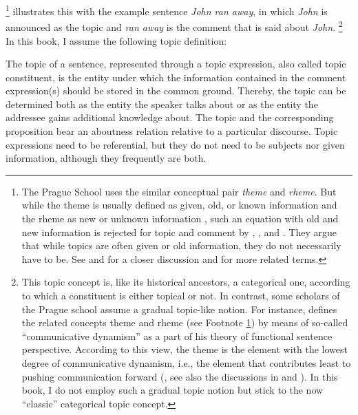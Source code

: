 \footnote{\label{note:prague}The Prague School uses the similar conceptual pair \textit{theme} and \textit{rheme}. 
But while the theme is usually defined as given,  old, or known information and the rheme as new or unknown information \citep[e.g.,][]{danes1970}, such an equation with old and new information is rejected for topic and comment by \citet{reinhart1981}, \citet{molnar1991}, and \citet{krifka2007}.
They argue that while topics are often given  or old information, they do not necessarily have to be.
See \citet[204--205]{musan2002} and \citet[12--13; 60--62]{molnar1991} for a closer discussion and for more related terms.}
%
\citet[201]{hockett1958} illustrates this with the example sentence \emph{John ran away}, in which \textit{John} is announced as the topic and \textit{ran away} is the comment that is said about \textit{John}.%
\footnote{This topic concept is, like its historical ancestors, a categorical one, according to which a constituent is either topical or not.
In contrast, some scholars of the Prague school assume a gradual topic-like notion.
For instance, \citet{firbas1971,firbas1992} defines the related concepts theme and rheme (see Footnote \ref{note:prague}) by means of so-called ``communicative dynamism'' as a part of his theory of functional sentence perspective.
According to this view, the theme is the element with the lowest degree of communicative dynamism, i.e., the element that contributes least to pushing communication forward (\cite[141]{firbas1971}, see also the discussions in \cite{molnar1991} and \cite{erteschik-shir2007}).
In this book, I do not employ such a gradual topic notion but stick to the now ``classic'' categorical topic concept.}
In this book, I assume the following topic definition:

\begin{theorem}
The topic of a sentence, represented through a topic expression, also called topic constituent, is the entity under which the information contained in the comment expression(s) should be stored in the common ground. 
Thereby, the topic can be determined both as the entity the speaker talks about or as the entity the addressee gains additional knowledge about.
The topic and the corresponding proposition bear an aboutness relation relative to a particular discourse.
Topic expressions need to be referential, but they do not need to be subjects nor given  information, although they frequently are both.
\end{theorem}

